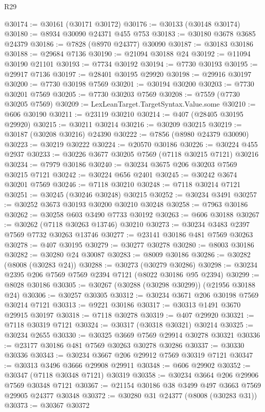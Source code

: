 \begin{lexlean}{R29}
\begin{coremodule}
@30174 := @30161 (@30171 @30172)
@30176 := @30133 (@30148 @30174)
@30180 := @8934 @30090 @24371 @455 @753
@30183 := @30180 @3678 @3685 @24379
@30186 := @7828 (@8970 @24377) @30090
@30187 := @30183 @30186
@30188 := @29684 @7136
@30190 := @21094 @30188 @24
@30192 := @11094 @30190 @21101
@30193 := @7734 @30192
@30194 := @7730 @30193
@30195 := @29917 @7136
@30197 := @28401 @30195 @29920
@30198 := @29916 @30197
@30200 := @7730 @30198 @7569
@30201 := @30194 @30200
@30203 := @7730 @30201 @7569
@30205 := @7730 @30203 @7569
@30208 := @7559 (@7730 @30205 @7569)
@30209 := LexLeanTarget.TargetSyntax.Value.some
@30210 := @606 @30190
@30211 := @23119 @30210
@30214 := @407 (@28405 @30195 @29920)
@30215 := @30211 @30214
@30216 := @30209 @30215
@30219 := @30187 (@30208 @30216) @24390
@30222 := @7856 (@8980 @24379 @30090)
@30223 := @30219 @30222
@30224 := @20570 @30186
@30226 := @30224 @455 @2937
@30233 := @30226 @3677 @30205 @7569 (@7118 @30215 @7121) @30216
@30234 := @7979 @30186
@30240 := @30234 @3675 @206 @30203 @7569 @30215 @7121
@30242 := @30224 @656 @2401
@30245 := @30242 @3674 @30201 @7569
@30246 := @7118 @30210
@30248 := @7118 @30214 @7121
@30251 := @30245 (@30246 @30248) @30215
@30252 := @30234 @3491
@30257 := @30252 @3673 @30193 @30200 @30210 @30248
@30258 := @7963 @30186
@30262 := @30258 @603 @3490 @7733 @30192
@30263 := @606 @30188
@30267 := @30262 (@7118 @30263 @13746) @30210
@30273 := @30234 @3483 @2397 @7569 @7732 @30263 @13746
@30277 := @23141 @30186 @481 @7569 @30263
@30278 := @407 @30195
@30279 := @30277 @30278
@30280 := @8003 @30186
@30282 := @30280 @24 @30087
@30283 := @8009 @30186
@30286 := @30282 (@8008 (@30283 @24))
@30288 := @30273 (@30279 @30286)
@30298 := @30234 @2395 @206 @7569 @7569 @2394 @7121 (@8022 @30186 @95 @2394)
@30299 := @8028 @30186
@30305 := @30267 (@30288 (@30298 @30299)) (@21956 @30188 @24)
@30306 := @30257 @30305
@30312 := @30234 @3671 @206 @30198 @7569 @30214 @7121
@30313 := @9221 @30186
@30317 := @30313 @1491 @3670 @29915 @30197
@30318 := @7118 @30278
@30319 := @407 @29920
@30321 := @7118 @30319 @7121
@30324 := @30317 (@30318 @30321) @30214
@30325 := @30234 @2655
@30330 := @30325 @3669 @7569 @29914 @30278 @30321
@30336 := @23177 @30186 @481 @7569 @30263 @30278 @30286
@30337 := @30330 @30336
@30343 := @30234 @3667 @206 @29912 @7569 @30319 @7121
@30347 := @30313 @3496 @3666 @29908 @29911
@30348 := @606 @29902
@30352 := @30347 (@7118 @30348 @7121) @30319
@30358 := @30234 @3664 @206 @29906 @7569 @30348 @7121
@30367 := @21154 @30186 @38 @3499 @497 @3663 @7569 @29905 @24377 @30348
@30372 := @30280 @31 @24377 (@8008 (@30283 @31))
@30373 := @30367 @30372

\end{coremodule}
\end{lexlean}
